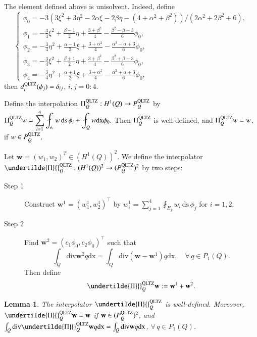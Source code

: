 \documentclass[12pt,showkeys]{amsart}
\newtheorem{lemma}[theorem]{Lemma}
\begin{document}
The element defined above is unisolvent. Indeed, define
$$
\left\{
\begin{array}{l}
\displaystyle \phi_0=-3(3\xi^2+3\eta^2-2\alpha\xi-2\beta\eta-(4+\alpha^2+\beta^2))/(2\alpha^2+2\beta^2+6), \\
\displaystyle \phi_1=-\frac{3}{4}\xi^2+\frac{\beta-1}{2}\eta+\frac{3+\beta^2}{4}-\frac{\beta^2-\beta+3}{6}\phi_0, \\
\displaystyle \phi_2=-\frac{3}{4}\eta^2+\frac{\alpha-1}{2}\xi+\frac{3+\alpha^2}{4}-\frac{\alpha^2-\alpha+3}{6}\phi_0, \\
\displaystyle \phi_3=-\frac{3}{4}\xi^2+\frac{\beta+1}{2}\eta+\frac{3+\beta^2}{4}-\frac{\beta^2+\beta+3}{6}\phi_0, \\ 
\displaystyle \phi_4=-\frac{3}{4}\eta^2+\frac{\alpha+1}{2}\xi+\frac{3+\alpha^2}{4}-\frac{\alpha^2+\alpha+3}{6}\phi_0,
\end{array}
\right.
$$
then $d_i^{\rm QLTZ}(\phi_j)=\delta_{ij}$, $i,j=0:4$.

Define the interpolation $\Pi_Q^{\rm QLTZ}:H^1(Q)\to P_Q^{\rm QLTZ}$ by $\displaystyle\Pi_Q^{\rm QLTZ}w=\sum_{i=1}^4\fint_{e_i}w{\,\mathrm{ds}\,}\phi_i+\fint_Qw{\mathrm{dx}}\phi_0.$ Then $\Pi_Q^{\rm QLTZ}$ is well-defined, and $\Pi_Q^{\rm QLTZ}w=w$, if $w\in P_Q^{\rm QLTZ}$.

Let $\mathbf{w}=(w_1,w_2)^T\in (H^1(Q))^2$. We define the interpolator $\undertilde{\Pi}{}_Q^{\rm QLTZ}: (H^1(Q))^2\to (P_Q^{\rm QLTZ})^2$ by two steps: 
\begin{description}
\item[Step 1] Construct $\mathbf{w}^1=(w^1_1,w^1_2)^\top$ by $\displaystyle w^1_i=\sum_{j=1}^4\fint_{E_j}w_i{\,\mathrm{ds}\,}\phi_j$ for $i=1,2$.
\item[Step 2] Find $\mathbf{w}^2=(c_1\phi_0,c_2\phi_0)^\top$ such that
\begin{equation}\label{eq:divpres}
\int_Q\mathrm{div}\mathbf{w}^2q{\mathrm{dx}}=\int_Q\mathrm{div}(\mathbf{w}-\mathbf{w}^1)q{\mathrm{dx}},\quad\forall\,q\in P_1(Q).
\end{equation}
Then define
$$
\undertilde{\Pi}{}_Q^{\rm QLTZ}\mathbf{w}:=\mathbf{w}^1+\mathbf{w}^2.
$$
\end{description}

\begin{lemma}
The interpolator $\undertilde{\Pi}{}_Q^{\rm QLTZ}$ is well-defined. Moreover, $\undertilde{\Pi}{}_Q^{\rm QLTZ}\mathbf{w}=\mathbf{w}$ if $\mathbf{w}\in (P_Q^{\rm QLTZ})^2$, and $\int_Q\mathrm{div}\undertilde{\Pi}{}_Q^{\rm QLTZ}\mathbf{w}q{\mathrm{dx}}=\int_Q\mathrm{div}\mathbf{w}q{\mathrm{dx}}$, $\forall\,q\in P_1(Q)$.
\end{lemma}
\end{document}
